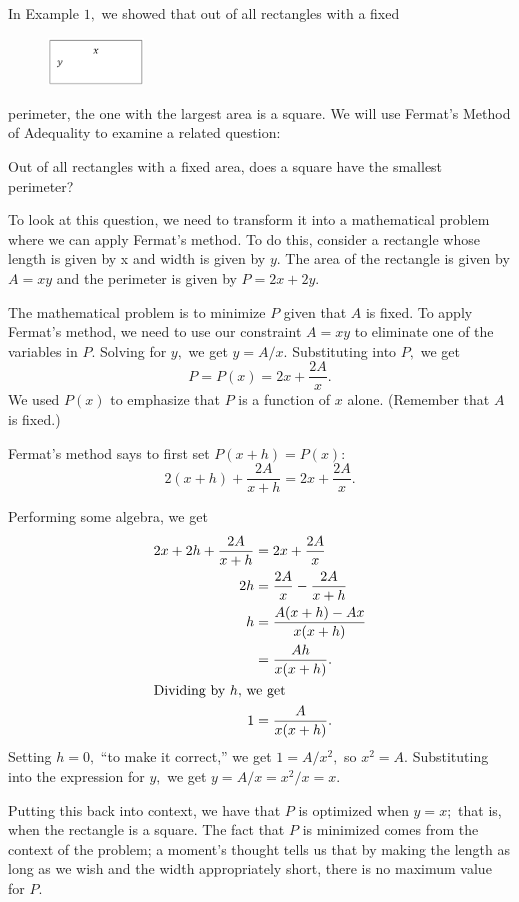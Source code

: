 In Example $1,$ we showed that out of all rectangles with a fixed
\begin{figure}
\includegraphics*[height=.75in,width=1in]{Figures/GenericRectangle}
\label{fig:GenericRectangle}
\end{figure}
perimeter, the one with the largest area is a square.  We will use
Fermat's Method of Adequality to examine a related question:

 Out of all rectangles with a fixed area,
does a square have the smallest perimeter? 

To look at this question, we need to transform it into a mathematical
problem where we can apply Fermat's method.  To do this, consider a
rectangle whose length is given by x and width is given by $y.$  The
area of the rectangle is given by $A=xy$ and the perimeter is given by
$P=2x+2y.$

The mathematical problem is to minimize $P$ given that $A$ is fixed.  To
apply Fermat's method, we need to use our constraint $A=xy$ to eliminate
one of the variables in $P.$  Solving for $y,$ we get $y=A/x.$  Substituting
into $P,$ we get 
$$
P=P(x) = 2x+\frac{2A}{x}.
$$
We used $P(x)$ to emphasize that $P$ is a function of $x$ alone.
(Remember that $A$ is fixed.)  

Fermat's method says to first set $P(x+h)=P(x):$
$$
2(x+h)+\frac{2A}{x+h}=2x+\frac{2A}{x}.
$$

Performing some algebra, we get 
\begin{align*}
  2x+2h+\frac{2A}{x+h}&=2x+\frac{2A}{x}\\
  2h&=\frac{2A}{x}-\frac{2A}{x+h}\\
  h&=\frac{A(x+h)-Ax}{x(x+h)}\\
   &=\frac{Ah}{x(x+h)}.\\
\intertext{Dividing by $h,$ we get}   
1&=\frac{A}{x(x+h)}.
\end{align*}
Setting $h=0,$ ``to make it correct,'' we get $1=A/x^2,$ so $x^2=A.$
Substituting into the expression for $y,$ we get $y=A/x=x^2/x=x.$  


Putting this back into context, we have that $P$ is optimized when
$y=x;$ that is, when the rectangle is a square.  The fact that $P$ is
minimized comes from the context of the problem; a moment's thought
tells us that by making the length as long as we wish and the width
appropriately short, there is no maximum value for $P.$

